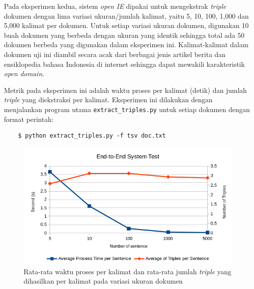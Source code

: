 Pada eksperimen kedua, sistem \textit{open IE} dipakai untuk mengekstrak \textit{triple} dokumen dengan lima variasi ukuran/jumlah kalimat, yaitu 5, 10, 100, 1,000 dan 5,000 kalimat per dokumen. Untuk setiap variasi ukuran dokumen, digunakan 10 buah dokumen yang berbeda dengan ukuran yang identik sehingga total ada 50 dokumen berbeda yang digunakan dalam eksperimen ini. Kalimat-kalimat dalam dokumen uji ini diambil secara acak dari berbagai jenis artikel berita dan ensiklopedia bahasa Indonesia di internet sehingga dapat mewakili karakteristik \textit{open domain}.

Metrik pada eksperimen ini adalah waktu proses per kalimat (detik) dan jumlah \textit{triple} yang diekstraksi per kalimat. Eksperimen ini dilakukan dengan menjalankan program utama \verb|extract_triples.py| untuk setiap dokumen dengan format perintah:

\begin{verbatim}
	$ python extract_triples.py -f tsv doc.txt
\end{verbatim}

\begin{figure}
	\includegraphics[width=\textwidth]{../images/system_performance.png}
	\caption{Rata-rata waktu proses per kalimat dan rata-rata jumlah \textit{triple} yang dihasilkan per kalimat pada variasi ukuran dokumen}
	\label{fig:system_performance}
\end{figure}

